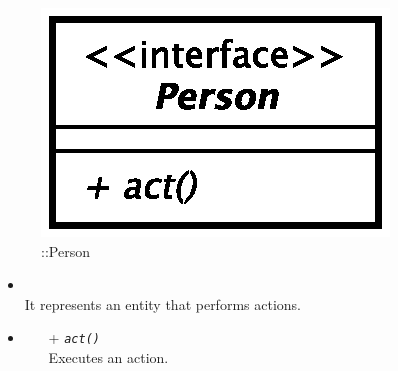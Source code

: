 \begin{figure}[h]
\centering
\includegraphics[scale=0.6,keepaspectratio]{images/solution/app/backend/person.eps}
\caption{\pActive::Person}
\label{fig:sd-app-person}
\end{figure}
\FloatBarrier
\begin{itemize}
  \item \textbf{\descr} \\
It represents an entity that performs actions.
  \item \textbf{\ops}
  \begin{itemize}
    \item[+]  \texttt{\textit{act()}} \\
Executes an action.
  \end{itemize}
\end{itemize}

